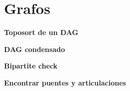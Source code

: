 \section{Grafos}
    \textbf{Toposort de un DAG}
    

    \textbf{DAG condensado}
    

    \textbf{Bipartite check}
    

    \textbf{Encontrar puentes y articulaciones}
    